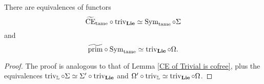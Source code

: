 \begin{lemma}
\label{Lemma 3.6.20}
There are equivalences of functors
$$
\widetilde{\operatorname{CE}}_{\operatorname{\operatorname{tame}}}\circ \operatorname{triv}_{\mathbf{Lie}}\simeq \operatorname{Sym}_{\operatorname{\operatorname{tame}}}\circ \Sigma
$$
and
$$
\widetilde{\operatorname{prim}}\circ \operatorname{Sym}_{\operatorname{\operatorname{tame}}} \simeq \operatorname{triv}_{\mathbf{Lie}}\circ \Omega.
$$
\end{lemma}
\begin{proof}
    The proof is analogous to that of Lemma \ref{CE of Trivial is cofree}, plus the equivalences 
    $
    \operatorname{triv}_{{\mathbb{L}}}\circ \Sigma \simeq \Sigma'\circ \operatorname{triv}_{\mathbf{Lie}} 
    $
    and $\Omega' \circ \operatorname{triv}_{{\mathbb{L}}} \simeq \operatorname{triv}_{\mathbf{Lie}}\circ \Omega $.
    
\end{proof}






